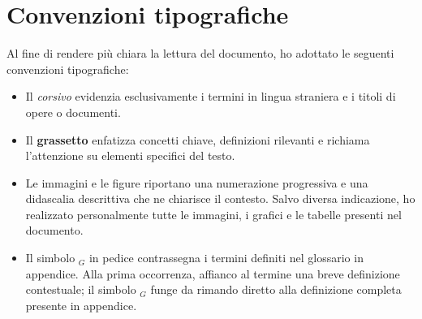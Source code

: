 \chapter*{Convenzioni tipografiche}
Al fine di rendere più chiara la lettura del documento, ho adottato le seguenti convenzioni tipografiche:
\begin{itemize}
    \item Il \textit{corsivo} evidenzia esclusivamente i termini in lingua straniera e i titoli di opere o documenti.
    \item Il \textbf{grassetto} enfatizza concetti chiave, definizioni rilevanti e richiama l'attenzione su elementi specifici del testo.
    \item Le immagini e le figure riportano una numerazione progressiva e una didascalia descrittiva che ne chiarisce il contesto. Salvo diversa indicazione, ho realizzato personalmente tutte le immagini, i grafici e le tabelle presenti nel documento.
    \item Il simbolo $_{G}$ in pedice contrassegna i termini definiti nel glossario in appendice. Alla prima occorrenza, affianco al termine una breve definizione contestuale; il simbolo $_{G}$ funge da rimando diretto alla definizione completa presente in appendice.
\end{itemize}
\endgroup
\vfill